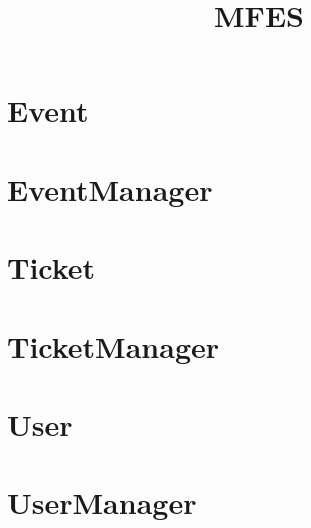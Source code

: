 \documentclass{article}
\begin{document}
\title{MFES}
\author{}
\maketitle
\tableofcontents

\section{Event}

\section{EventManager}

\section{Ticket}

\section{TicketManager}

\section{User}

\section{UserManager}

\end{document}
